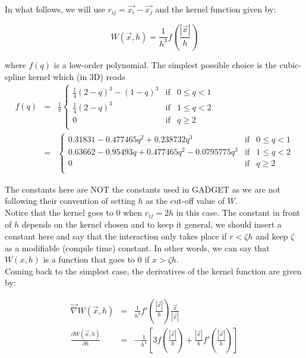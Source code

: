\documentclass[a4paper,10pt]{article}
\begin{document}
In what follows, we will use $r_{ij} = \vec{x_i} - \vec{x_j}$ and the kernel function given by:

\begin{equation}
 W(\vec{x}, h) = \frac{1}{h^3}f\left(\frac{|\vec{x}|}{h}\right) 
\end{equation}

where $f(q)$ is a low-order polynomial. The simplest possible choice is the cubic-spline kernel which (in 3D) reads
\begin{eqnarray*}
 f(q) &=& \frac{1}{\pi}\left\lbrace \begin{array}{rcl}
                      \frac{1}{4}(2-q)^3 - (1-q)^3 & \mbox{if} & 0 \leq q < 1 \\
		      \frac{1}{4}(2-q)^3 & \mbox{if} & 1 \leq q < 2 \\
		      0 & \mbox{if} & q \geq 2 \\
                     \end{array}
 \right. \\
&=&\left\lbrace \begin{array}{rcl}
    0.31831 -0.477465 q^2+0.238732 q^3& \mbox{if} & 0 \leq q < 1 \\
   0.63662 -0.95493 q+0.477465 q^2-0.0795775 q^3  & \mbox{if} & 1 \leq q < 2 \\
		      0 & \mbox{if} & q \geq 2 \\
                     \end{array}
 \right.
\end{eqnarray*}

The constants here are NOT the constants used in GADGET as we are not following their convention of setting $h$ as the
cut-off value of $W$.\\
Notice that the kernel goes to $0$ when $r_{ij} = 2h$ in this case. The constant in front of $h$ depends on the kernel
chosen and to keep it general, we should insert a constant here and say that the interaction only takes place if
$r<\zeta h$ and keep $\zeta$ as a modifiable (compile time) constant. In other words, we can say that $W(x,h)$ is a
function that goes to $0$ if $x > \zeta h$. \\
Coming back to the simplest case, the derivatives of the kernel function are given by:

\begin{eqnarray*}
 \vec\nabla W(\vec{x},h) &=& \frac{1}{h^4}f'\left(\frac{|\vec{x}|}{h}\right) \frac{\vec{x}}{|\vec{x}|} \\
 \frac{\partial W(\vec{x},h)}{\partial h} &=&- \frac{1}{h^4}\left[3f\left(\frac{|\vec{x}|}{h}\right) + 
\frac{|\vec{x}|}{h}f'\left(\frac{|\vec{x}|}{h}\right)\right]
\end{eqnarray*}
\end{document}
